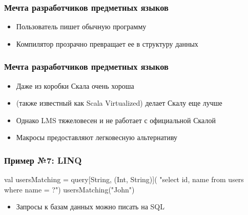 \documentclass[svgnames,hyperref={bookmarks=false},11pt]{beamer}
\begin{document}
\begin{frame}[fragile]
\frametitle{Мечта разработчиков предметных языков}

\begin{itemize}
\item Пользователь пишет обычную программу
\item Компилятор прозрачно превращает ее в структуру данных
\end{itemize}
\end{frame}

\begin{frame}[fragile]
\frametitle{Мечта разработчиков предметных языков}

\begin{itemize}
\item Даже из коробки Скала очень хороша
\item {} (также известный как Scala Virtualized) делает Скалу еще лучше
\item Однако LMS тяжеловесен и не работает с официальной Скалой
\item Макросы предоставляют легковесную альтернативу
\end{itemize}
\end{frame}

\begin{frame}[fragile, t]
\frametitle{Пример №7: LINQ}

\begin{semiverbatim}
val usersMatching = query[String, (Int, String)](
  "select id, name from users where name = ?")
usersMatching("John")



\end{semiverbatim}

\begin{itemize}
\item Запросы к базам данных можно писать на SQL
\end{itemize}
\end{frame}
\end{document}
